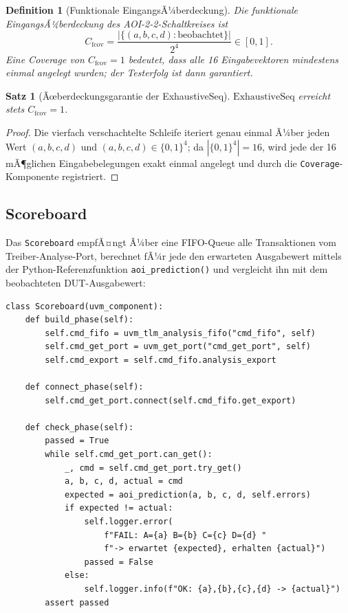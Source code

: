 ﻿\documentclass[12pt,a4paper]{report}
\newtheorem{definition}{Definition}[section]
\newtheorem{theorem}{Satz}[section]
\begin{document}
\begin{definition}[Funktionale EingangsÃ¼berdeckung]
\label{def:func_coverage}
Die \emph{funktionale EingangsÃ¼ber\-deckung} des AOI-2-2-Schaltkreises ist
\[
    C_{\mathrm{fcov}} = \frac{|\{(a,b,c,d) : \text{beobachtet}\}|}{2^4} \in [0, 1].
\]
Eine Coverage von $C_{\mathrm{fcov}} = 1$ bedeutet, dass alle 16 Eingabevektoren
mindestens einmal angelegt wurden; der Testerfolg ist dann garantiert.
\end{definition}

\begin{theorem}[Ãœberdeckungsgarantie der ExhaustiveSeq]
\label{thm:coverage_exhaustive}
$\mathrm{ExhaustiveSeq}$ erreicht stets $C_{\mathrm{fcov}} = 1$.
\end{theorem}

\begin{proof}
Die vierfach verschachtelte Schleife iteriert genau einmal Ã¼ber jeden Wert
$(a, b, c, d)$ und $(a, b, c, d) \in \{0,1\}^4$; da $|\{0,1\}^4| = 16$, wird jede der
16 mÃ¶glichen Eingabebelegungen exakt einmal angelegt und durch die
\texttt{Coverage}-Komponente registriert.
\end{proof}

\subsection{Scoreboard}
\label{sssec:scoreboard}

Das \texttt{Scoreboard} empfÃ¤ngt Ã¼ber eine FIFO-Queue alle Transaktionen vom
Treiber-Analyse-Port, berechnet fÃ¼r jede den erwarteten Ausgabewert mittels
der Python-Referenzfunktion \texttt{aoi\_prediction()} und vergleicht ihn mit
dem beobachteten DUT-Ausgabewert:

\begin{lstlisting}[style=pythonstyle, caption={Scoreboard: Soll-Ist-Vergleich in der \texttt{check\_phase}}]
class Scoreboard(uvm_component):
    def build_phase(self):
        self.cmd_fifo = uvm_tlm_analysis_fifo("cmd_fifo", self)
        self.cmd_get_port = uvm_get_port("cmd_get_port", self)
        self.cmd_export = self.cmd_fifo.analysis_export

    def connect_phase(self):
        self.cmd_get_port.connect(self.cmd_fifo.get_export)

    def check_phase(self):
        passed = True
        while self.cmd_get_port.can_get():
            _, cmd = self.cmd_get_port.try_get()
            a, b, c, d, actual = cmd
            expected = aoi_prediction(a, b, c, d, self.errors)
            if expected != actual:
                self.logger.error(
                    f"FAIL: A={a} B={b} C={c} D={d} "
                    f"-> erwartet {expected}, erhalten {actual}")
                passed = False
            else:
                self.logger.info(f"OK: {a},{b},{c},{d} -> {actual}")
        assert passed
\end{lstlisting}
\end{document}
